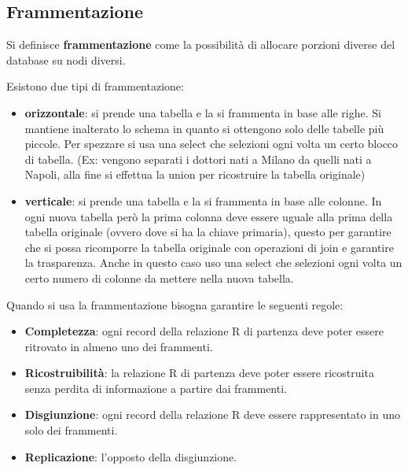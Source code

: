 \subsection{Frammentazione}
\begin{definizione}
      Si definisce \textbf{frammentazione} come la possibilità di allocare porzioni
      diverse del database su nodi diversi.
\end{definizione}
Esistono due tipi di frammentazione:
\begin{itemize}
      \item \textbf{orizzontale}: si prende una tabella e la si
            frammenta in base alle righe. Si mantiene inalterato lo schema in
            quanto si ottengono solo delle tabelle più piccole. Per spezzare si
            usa una select che selezioni ogni volta un certo blocco di tabella.
            (Ex: vengono separati i dottori nati a Milano da quelli nati a Napoli,
            alla fine si effettua la union per ricostruire la tabella originale)
      \item \textbf{verticale}: si prende una tabella e la si frammenta
            in base alle colonne. In ogni nuova tabella però la prima colonna
            deve essere uguale alla prima della tabella originale (ovvero dove si
            ha la chiave primaria), questo per garantire che si possa ricomporre
            la tabella originale con operazioni di join e garantire la
            trasparenza. Anche in questo caso uso una select che selezioni ogni
            volta un certo numero di colonne da mettere nella nuova tabella.
\end{itemize}
Quando si usa la frammentazione bisogna garantire le seguenti regole:
\begin{itemize}
      \item \textbf{Completezza}: ogni record della relazione R di partenza
            deve poter essere ritrovato in almeno uno dei frammenti.
      \item \textbf{Ricostruibilità}: la relazione R di partenza deve poter essere
            ricostruita senza perdita di informazione a partire dai frammenti.
      \item \textbf{Disgiunzione}: ogni record della relazione R deve essere
            rappresentato in uno solo dei frammenti.
      \item \textbf{Replicazione}: l'opposto della disgiunzione.
\end{itemize}
